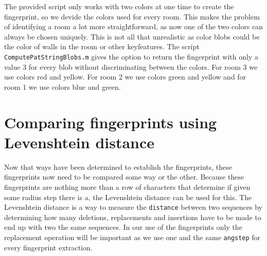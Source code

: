 \documentclass[a4paper, 20pt]{article}
\begin{document}
\begin{figure}[!ht]
\centering
\begin{floatrow}
  
\end{floatrow}
\end{figure}

The provided script only works with two colors at one time to create the
fingerprint, so we devide the colors used for every room. This makes the problem
of identifying a room
a lot more straightforward, as now one of the two colors can always be chosen
uniquely. This is not all that unrealistic as color blobs could be the color of
walls in the room or other keyfeatures. The script \texttt{ComputePatStringBlobs.m} gives the option to return
the fingerprint with only a value 3 for every blob without discriminating
between
the colors.
For room 3 we use colors red and yellow. For room 2 we use colors green and
yellow and for room 1 we use colors blue and green. 


\section{Comparing fingerprints using Levenshtein distance}
Now that ways have been determined to establish the fingerprints, these
fingerprints now need to be compared some way or the other. Because these
fingerprints are nothing more than a row of characters that determine if
given some radius step there is a, the Levenshtein distance can be used for
this. The Levenshtein distance is a way to measure the \texttt{distance}
between two sequences by determining how many deletions, replacements and
insertions have to be made to end up with two the same sequences. In our use of
the fingerprints only the replacement operation will be important as we use one
and the same \texttt{angstep} for every fingerprint extraction.
\end{document}
